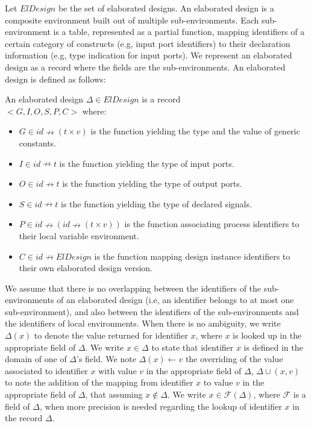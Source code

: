 Let $ElDesign$ be the set of elaborated designs. An elaborated design
is a composite environment built out of multiple sub-environments.
Each sub-environment is a table, represented as a partial function,
mapping identifiers of a certain category of constructs (e.g, input
port identifiers) to their declaration information (e.g, type
indication for input ports). We represent an elaborated design as a
record where the fields are the sub-environments. An elaborated design
is defined as follows:

\begin{definition}
  \label{def:elab-design}
  An elaborated design $\Delta\in{}ElDesign$ is a record\\
  ${<}G, I, O, S, P, C{>}$ where:
  \begin{itemize}[label=$-$]
  \item $G\in{}id\nrightarrow{}(t\times{}v)$
    is the function yielding the type and the value of generic
    constants.
  \item $I\in{}id\nrightarrow{}t$ is the function
    yielding the type of input ports.
  \item $O\in{}id\nrightarrow{}t$ is the function
    yielding the type of output ports.
  \item
    $S\in{}id\nrightarrow{}t$
    is the function yielding the type of declared signals.
  \item $P\in{}id\nrightarrow(id\nrightarrow{}(t\times{}v))$ is the
    function associating process identifiers to their local variable
    environment.
  \item $C\in{}id{}\nrightarrow{}ElDesign$ is the function mapping
    design instance identifiers to their own elaborated design
    version.
  \end{itemize}
\end{definition}

We assume that there is no overlapping between the identifiers of the
sub-environments of an elaborated design (i.e, an identifier belongs
to at most one sub-environment), and also between the identifiers of
the sub-environments and the identifiers of local environments. When
there is no ambiguity, we write $\Delta(x)$ to denote the value
returned for identifier $x$, where $x$ is looked up in the appropriate
field of $\Delta$. We write $x\in\Delta$ to state that identifier $x$
is defined in the domain of one of $\Delta$'s field. We note
$\Delta(x)\leftarrow{}v$ the overriding of the value associated to
identifier $x$ with value $v$ in the appropriate field of $\Delta$,
$\Delta\cup{}(x,v)$ to note the addition of the mapping from
identifier $x$ to value $v$ in the appropriate field of $\Delta$, that
assuming $x\notin\Delta$. We write $x\in\mathcal{F}(\Delta)$, where
$\mathcal{F}$ is a field of $\Delta$, when more precision is needed
regarding the lookup of identifier $x$ in the record $\Delta$.\\

